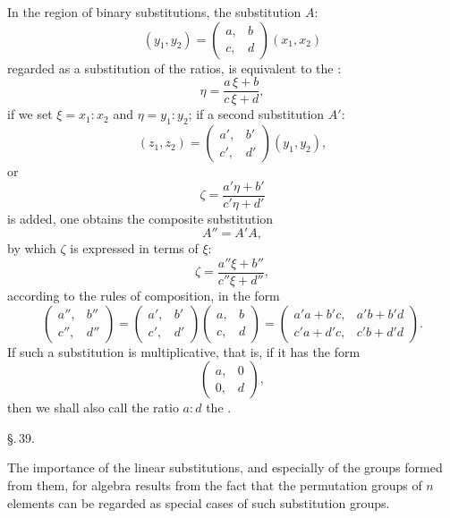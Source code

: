 
In the region of binary substitutions, the substitution $A$:
\[
(y_1, y_2) = \begin{pmatrix} a, & b \\ c, & d \end{pmatrix} (x_1, x_2)
\]
regarded as a substitution of the ratios, is equivalent to the :
\[
\eta = \frac{a\,\xi + b}{c\,\xi + d},
\]
if we set $\xi = x_1 : x_2$ and $\eta = y_1 : y_2$; if a second substitution $A'$:
\[
(z_1, z_2) = \begin{pmatrix} a', & b' \\ c', & d' \end{pmatrix} (y_1, y_2),
\]
or
\[
\zeta = \frac{a'\eta + b'}{c'\eta + d'}
\]
is added, one obtains the composite substitution
\[
A'' = A'A,
\]
by which $\zeta$ is expressed in terms of $\xi$:
\[
\zeta = \frac{a''\xi + b''}{c''\xi + d''},
\]
according to the rules of composition, in the form
\[
\begin{pmatrix} a'', & b'' \\ c'', & d'' \end{pmatrix} = \begin{pmatrix} a', & b' \\ c', & d' \end{pmatrix} \begin{pmatrix} a, & b \\ c, & d \end{pmatrix} = \begin{pmatrix} a'a + b'c, & a'b + b'd \\ c'a + d'c, & c'b + d'd \end{pmatrix}.
\]
If such a substitution is multiplicative, that is, if it has the form
\[
\begin{pmatrix} a, & 0 \\ 0, & d \end{pmatrix},
\]
then we shall also call the ratio $a : d$ the .

\begin{center}
\S.\,39.

\end{center}

The importance of the linear substitutions, and especially of the  groups formed from them, for algebra results from the fact that the permutation groups of $n$ elements can be regarded as special cases of such substitution groups.
